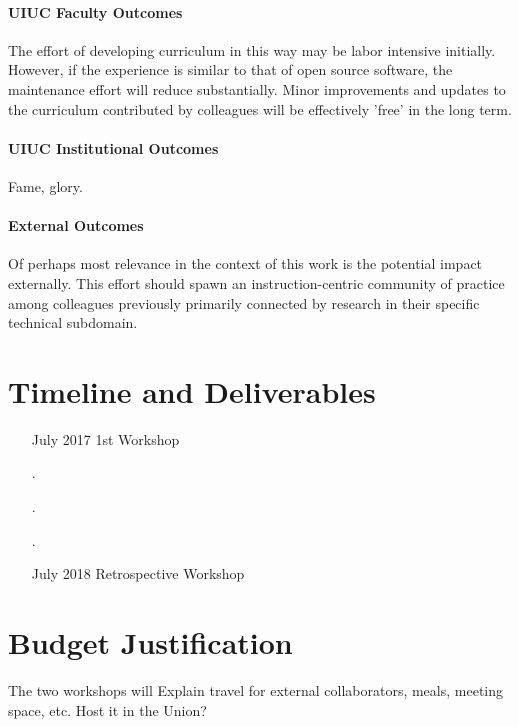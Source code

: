 \documentclass[11pt]{article}
\begin{document}
          \paragraph{UIUC Faculty Outcomes}
          The effort of developing curriculum in this way may be labor 
          intensive initially. However, if the experience is similar to that of 
          open source software, the maintenance effort will reduce 
          substantially. Minor improvements and updates to the curriculum 
          contributed by colleagues will be effectively 'free' in the long 
          term. 

          \paragraph{UIUC Institutional Outcomes}

          Fame, glory.

          \paragraph{External Outcomes}

          Of perhaps most relevance in the context of this work is the 
          potential impact externally. This effort should spawn an 
          instruction-centric community of 
          practice among colleagues previously primarily connected by research 
          in their specific technical subdomain. 

          \section{Timeline and Deliverables}

          \begin{itemize}
                  \item[July 2017] 1st Workshop
                  \item[.] 
                  \item[.] 
                  \item[.] 
                  \item[July 2018] Retrospective Workshop
          \end{itemize}

          \section{Budget Justification}
          The two workshops will 
          Explain travel for external collaborators, meals, meeting space, etc. 
          Host it in the Union?
\end{document}
